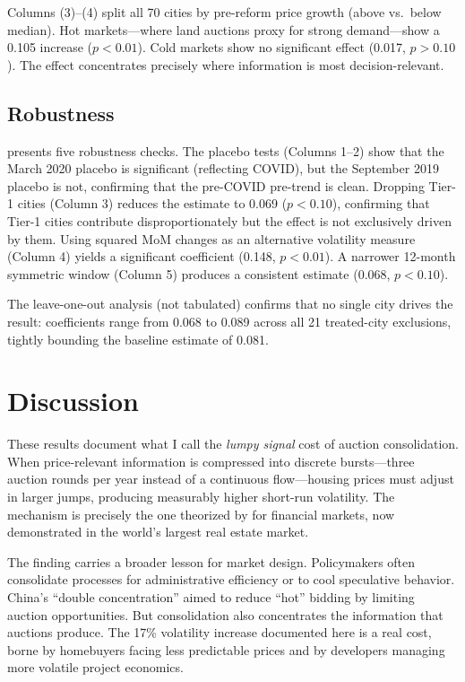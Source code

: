 \documentclass[12pt]{article}
\begin{document}
Columns (3)--(4) split all 70 cities by pre-reform price growth (above vs.\ below median). Hot markets---where land auctions proxy for strong demand---show a 0.105 increase ($p < 0.01$). Cold markets show no significant effect (0.017, $p > 0.10$). The effect concentrates precisely where information is most decision-relevant.



\subsection{Robustness}

 presents five robustness checks. The placebo tests (Columns 1--2) show that the March 2020 placebo is significant (reflecting COVID), but the September 2019 placebo is not, confirming that the pre-COVID pre-trend is clean. Dropping Tier-1 cities (Column 3) reduces the estimate to 0.069 ($p < 0.10$), confirming that Tier-1 cities contribute disproportionately but the effect is not exclusively driven by them. Using squared MoM changes as an alternative volatility measure (Column 4) yields a significant coefficient (0.148, $p < 0.01$). A narrower 12-month symmetric window (Column 5) produces a consistent estimate (0.068, $p < 0.10$).

The leave-one-out analysis (not tabulated) confirms that no single city drives the result: coefficients range from 0.068 to 0.089 across all 21 treated-city exclusions, tightly bounding the baseline estimate of 0.081.



\section{Discussion}

These results document what I call the \textit{lumpy signal} cost of auction consolidation. When price-relevant information is compressed into discrete bursts---three auction rounds per year instead of a continuous flow---housing prices must adjust in larger jumps, producing measurably higher short-run volatility. The mechanism is precisely the one theorized by \citet{grossman1980impossibility} for financial markets, now demonstrated in the world's largest real estate market.

The finding carries a broader lesson for market design. Policymakers often consolidate processes for administrative efficiency or to cool speculative behavior. China's ``double concentration'' aimed to reduce ``hot'' bidding by limiting auction opportunities. But consolidation also concentrates the information that auctions produce. The 17\% volatility increase documented here is a real cost, borne by homebuyers facing less predictable prices and by developers managing more volatile project economics.
\end{document}
